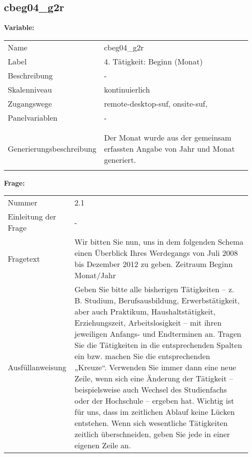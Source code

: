 	
	
	\subsection{cbeg04\_g2r}
	\label{subSection:cbeg04_g2r}

	\noindent\textbf{Variable:}\\
		\begin{tabular}{lL{11.3cm}}
			\label{tableVariable:cbeg04_g2r}
			Name & cbeg04\_g2r \\
			Label & 4. Tätigkeit: Beginn (Monat)  \\
			Beschreibung & - \\
			Skalenniveau & kontinuierlich \\
			Zugangswege &
				remote-desktop-suf,
				onsite-suf,
 \\
			Panelvariablen & -
			 \\
			 \\
 \\
					Generierungsbeschreibung & Der Monat wurde aus der gemeinsam erfassten Angabe von Jahr und Monat generiert. 
				 \\	
			 \\
		\end{tabular}

		\vspace*{1 cm}
		\noindent\textbf{Frage:}\\
		\begin{tabular}{lL{11.3cm}}
			\label{tableQuestion:cbeg04_g2r}
			Nummer & 2.1 \\
			Einleitung der Frage & - \\
			Fragetext & Wir bitten Sie nun, uns in dem folgenden Schema einen Überblick Ihres Werdegangs von Juli 2008 bis Dezember 2012 zu geben.
Zeitraum
Beginn
Monat/Jahr \\
			Ausfüllanweisung & Geben Sie bitte alle bisherigen Tätigkeiten – z. B. Studium, Berufsausbildung, Erwerbstätigkeit, aber auch Praktikum, Haushaltstätigkeit,
Erziehungszeit, Arbeitslosigkeit – mit ihren jeweiligen Anfangs- und Endterminen an. Tragen Sie die Tätigkeiten in die entsprechenden Spalten ein bzw. machen Sie die entsprechenden „Kreuze“. Verwenden Sie immer dann eine neue Zeile, wenn sich eine Änderung der Tätigkeit – beispielsweise auch Wechsel des Studienfachs oder der Hochschule – ergeben hat. Wichtig ist für uns, dass im zeitlichen Ablauf keine Lücken entstehen. Wenn sich wesentliche Tätigkeiten zeitlich überschneiden, geben Sie jede in einer eigenen Zeile an. \\
		\end{tabular}




